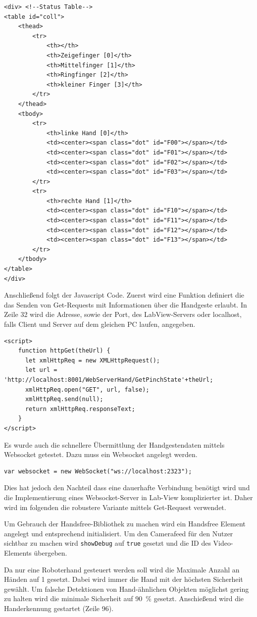 \documentclass[a4paper,12pt,final]{article} %
\numberwithin{equation}{section} %
\numberwithin{figure}{section} %
\numberwithin{table}{section} %
\begin{document}
\begin{lstlisting}[firstnumber=38]
<div> <!--Status Table-->
<table id="coll">
	<thead>
		<tr>
			<th></th>
			<th>Zeigefinger [0]</th>
			<th>Mittelfinger [1]</th>
			<th>Ringfinger [2]</th>
			<th>kleiner Finger [3]</th>
		</tr>
	</thead>
	<tbody>
		<tr>
			<th>linke Hand [0]</th>
			<td><center><span class="dot" id="F00"></span></td>
			<td><center><span class="dot" id="F01"></span></td>
			<td><center><span class="dot" id="F02"></span></td>
			<td><center><span class="dot" id="F03"></span></td>
		</tr>
		<tr>
			<th>rechte Hand [1]</th>
			<td><center><span class="dot" id="F10"></span></td>
			<td><center><span class="dot" id="F11"></span></td>
			<td><center><span class="dot" id="F12"></span></td>
			<td><center><span class="dot" id="F13"></span></td>
		</tr>
	</tbody>
</table>
</div>
\end{lstlisting}

Anschließend folgt der Javascript Code. Zuerst wird eine Funktion definiert die das Senden von Get-Requests mit Informationen über die Handgeste erlaubt. In Zeile 32 wird die Adresse, sowie der Port, des LabView-Servers oder localhost, falls Client und Server auf dem gleichen PC laufen, angegeben.
\begin{lstlisting}[firstnumber=67]
<script>
	function httpGet(theUrl) {
	  let xmlHttpReq = new XMLHttpRequest();
      let url = 'http://localhost:8001/WebServerHand/GetPinchState'+theUrl; 
	  xmlHttpReq.open("GET", url, false);
	  xmlHttpReq.send(null);
	  return xmlHttpReq.responseText;
	}
</script>
\end{lstlisting}

Es wurde auch die schnellere Übermittlung der Handgestendaten mittels Websocket getestet. Dazu muss ein Websocket angelegt werden.
\begin{lstlisting}[firstnumber=99]
var websocket = new WebSocket("ws://localhost:2323");
\end{lstlisting}
Dies hat jedoch den Nachteil dass eine dauerhafte Verbindung benötigt wird und die Implementierung eines Websocket-Server in Lab-View komplizierter ist. Daher wird im folgenden die robustere Variante mittels Get-Request verwendet.

Um Gebrauch der Handsfree-Bibliothek zu machen wird ein Handsfree Element angelegt und entsprechend initialisiert.  Um den Camerafeed für den Nutzer sichtbar zu machen wird \texttt{showDebug} auf \texttt{true} gesetzt und die ID des Video-Elements übergeben.

Da nur eine Roboterhand gesteuert werden soll wird die Maximale Anzahl an Händen auf 1 gesetzt.  Dabei wird immer die Hand mit der höchsten Sicherheit gewählt. Um falsche Detektionen von Hand-ähnlichen Objekten möglichst gering zu halten wird die minimale Sicherheit auf 90~\% gesetzt. 
Anschießend wird die Handerkennung gestartet (Zeile 96).
\end{document}
